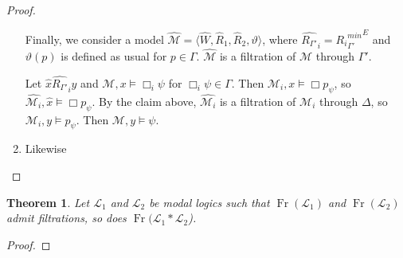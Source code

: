 \documentclass[a4paper]{article}
\theoremstyle{defin}
\theoremstyle{theorem}
\newtheorem{theorem}{Theorem}
\theoremstyle{prop}
\theoremstyle{lemma}
\theoremstyle{fact}
\theoremstyle{ex}
\theoremstyle{col}
\theoremstyle{claim}
\begin{document}
\begin{proof}
\begin{enumerate}
  Finally, we consider a model $\widehat{\mathcal{M}} = \langle \widehat{W}, \widehat{R}_1, \widehat{R}_2, \vartheta \rangle$, where $\widehat{R_{\Gamma'}}_i = {{R_i}^{min}_{\Gamma'}}^E$ and $\vartheta(p)$ is defined as usual for $p \in \Gamma$. $\widehat{\mathcal{M}}$ is a filtration of $\mathcal{M}$ through $\Gamma'$.

  Let $\hat{x} \widehat{R_{\Gamma'}}_i \hat{y}$ and $\mathcal{M}, x \models \Box_i \psi$ for $\Box_i \psi \in \Gamma$. Then $\mathcal{M}_i, x \models \Box p_{\psi}$, so $\widehat{\mathcal{M}_i}, \hat{x} \models \Box p_{\psi}$.
  By the claim above, $\widehat{\mathcal{M}_i}$ is a filtration of $\mathcal{M}_i$ through $\Delta$, so $\mathcal{M}_i, y \models p_{\psi}$. Then $\mathcal{M}, y \models \psi$.

  \item Likewise
  \end{enumerate}
\end{proof}

\begin{theorem}
  Let $\mathcal{L}_1$ and $\mathcal{L}_2$ be modal logics such that $\operatorname{Fr}(\mathcal{L}_1)$ and $\operatorname{Fr}(\mathcal{L}_2)$ admit filtrations, so does $\operatorname{Fr}(\mathcal{L}_1 * \mathcal{L}_2$).
\end{theorem}

\begin{proof}

\end{proof}



\end{document}
